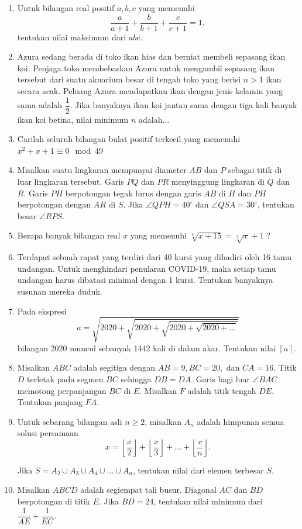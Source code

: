 \documentclass[12pt]{scrartcl}
\begin{document}
\begin{enumerate}
		\item Untuk bilangan real positif $a,b,c$ yang memenuhi $$\frac{a}{a+1}+\frac{b}{b+1}+\frac{c}{c+1} = 1,$$ tentukan nilai maksimum dari $abc$.
		
		\item Azura sedang berada di toko ikan hias dan berniat membeli sepasang ikan koi. Penjaga toko membebaskan Azura untuk mengambil sepasang ikan tersebut dari suatu akuarium besar di tengah toko yang berisi $n>1$ ikan secara acak. Peluang Azura mendapatkan ikan dengan jenis kelamin yang sama adalah $\dfrac12$. Jika banyaknya ikan koi jantan sama dengan tiga kali banyak ikan koi betina, nilai minimum $n$ adalah...
		
		\item Carilah seluruh bilangan bulat positif terkecil yang memenuhi $x^2+x+1 \equiv 0 \mod 49$
		
		\item Misalkan suatu lingkaran mempunyai diameter $AB$ dan $P$ sebagai titik di luar lingkaran tersebut. Garis $PQ$ dan $PR$ menyinggung lingkaran di $Q$ dan $R$. Garis $PH$ berpotongan tegak lurus dengan garis $AB$ di $H$ dan $PH$ berpotongan dengan $AR$ di $S$. Jika $\angle QPH = 40^\circ$ dan $\angle QSA = 30^\circ$, tentukan besar $\angle RPS$.
		
		\item Berapa banyak bilangan real $x$ yang memenuhi $\sqrt[4]{x+15} = \sqrt[3]{x}+1$ ?
		
		\item  Terdapat sebuah rapat yang terdiri dari 40 kursi yang dihadiri oleh 16 tamu undangan.
		Untuk menghindari penularan COVID-19, maka setiap tamu undangan harus dibatasi minimal
		dengan 1 kursi. Tentukan banyaknya susunan mereka duduk.

		
		\item Pada ekspresi $$a= \sqrt{2020+\sqrt{2020+\sqrt{2020+\sqrt{2020+...}}}}$$
		bilangan 2020 muncul sebanyak 1442 kali di dalam akar. Tentukan nilai $\left \lceil a \right \rceil$.
		
		\item Misalkan $ABC$ adalah segitiga dengan $AB=9, BC=20,$ dan $CA=16$. Titik $D$ terletak pada segmen $BC$ sehingga $DB=DA$. Garis bagi luar $\angle BAC$ memotong perpanjangan $BC$ di $E$. Misalkan $F$ adalah titik tengah $DE$. Tentukan panjang $FA$.
		
		\item Untuk sebarang bilangan asli $n \ge 2$, misalkan $A_n$ adalah himpunan semua solusi persamaan $$x=\left\lfloor \frac{x}{2}\right \rfloor+\left\lfloor \frac{x}{3}\right \rfloor+\dots+\left\lfloor\frac{x}{n} \right \rfloor.$$
		
		Jika $S = A_2 \cup A_3 \cup A_4 \cup \dots \cup A_n$, tentukan nilai dari elemen terbesar $S$.
		
		\item Misalkan $ABCD$ adalah segiempat tali busur. Diagonal $AC$ dan $BD$ berpotongan di titik $E$. Jika $BD=24$, tentukan nilai minimum dari $\dfrac{1}{AE}+\dfrac{1}{EC}$.
		
\end{enumerate}
\end{document}

